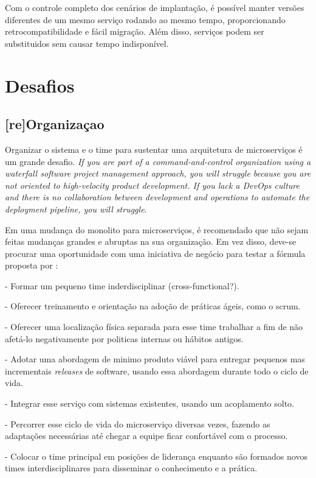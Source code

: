 Com o controle completo dos cenários de implantação, é possível manter versões diferentes de um mesmo serviço rodando ao mesmo tempo, proporcionando retrocompatibilidade e fácil migração. Além disso, serviços podem ser substituidos sem causar tempo indisponível.

\section{Desafios}

\subsection{[re]Organizaçao}

Organizar o sistema e o time para sustentar uma arquitetura de microserviços é um grande desafio. \emph{If you are part of a command-and-control organization using a waterfall software project management approach, you will struggle because you are not oriented to high-velocity product development. If you lack a DevOps culture and there is no collaboration between development and operations to automate the deployment pipeline, you will struggle}.

Em uma mudança do monolito para microserviços, é recomendado que não sejam feitas mudanças grandes e abruptas na sua organização. Em vez disso, deve-se procurar uma oportunidade com uma iniciativa de negócio para testar a fórmula proposta por  : 

- Formar um pequeno time inderdisciplinar (cross-functional?).

- Oferecer treinamento e orientação na adoção de práticas ágeis, como o scrum.

- Oferecer uma localização física separada para esse time trabalhar a fim de não afetá-lo negativamente por politicas internas ou hábitos antigos.

- Adotar uma abordagem de minimo produto viável para entregar pequenos mas incrementais \emph{releases} de software, usando essa abordagem durante todo o ciclo de vida.

- Integrar esse serviço com sistemas existentes, usando um acoplamento solto.

- Percorrer esse ciclo de vida do microserviço diversas vezes, fazendo as adaptações necessárias até chegar a equipe ficar confortável com o processo.

- Colocar o time principal em posições de liderança enquanto são formados novos times interdisciplinares para disseminar o conhecimento e a prática.

